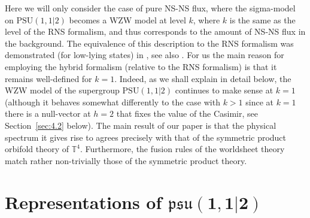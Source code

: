 \documentclass[12pt,a4paper]{article}
\begin{document}
Here we will only consider the case of pure NS-NS flux, where the sigma-model on $\mathrm{PSU}(1,1|2)$ becomes a WZW model at level $k$, where $k$ is the same as the level of the RNS formalism, and thus corresponds to the amount of NS-NS flux in the background. The equivalence of this description to the RNS formalism was demonstrated (for low-lying states) in \cite{Troost:2011fd,Gaberdiel:2011vf, Gerigk:2012cq}, see also \cite{Gotz:2006qp}. For us the main reason for employing the hybrid formalism (relative to the RNS formalism) is that it remains well-defined for $k=1$. Indeed, as we shall explain in detail below, the WZW model of the supergroup 
$\mathrm{PSU}(1,1|2)$ continues to make sense at $k=1$ (although it behaves somewhat differently to the case with $k>1$ since at $k=1$ there is a null-vector at $h=2$ that fixes the value of the Casimir, see Section~\ref{sec:4.2} below). The main result of our paper is that the physical spectrum it gives rise to agrees precisely with that of the symmetric product orbifold theory of ${\mathbb T}^4$. Furthermore, the fusion rules of the worldsheet theory match rather non-trivially  those of the symmetric product theory. 


\section{Representations of $\boldsymbol{\mathfrak{psu}(1,1|2)}$} \label{sec:representations psu112}
\end{document}

